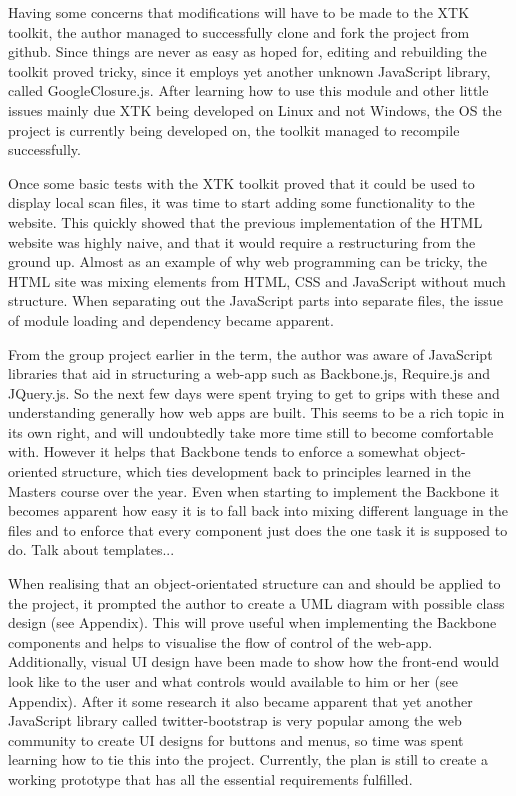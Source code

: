 \documentclass[a4paper,11pt,titlepage]{article}
\begin{document}
Having some concerns that modifications will have to be made to the XTK toolkit, the author managed to successfully clone and fork the project from github. Since things are never as easy as hoped for, editing and rebuilding the toolkit proved tricky, since it employs yet another unknown JavaScript library, called GoogleClosure.js. After learning how to use this module and other little issues mainly due XTK being developed on Linux and not Windows, the OS the project is currently being developed on, the toolkit managed to recompile successfully.

Once some basic tests with the XTK toolkit proved that it could be used to display local scan files, it was time to start adding some functionality to the website. This quickly showed that the previous implementation of the HTML website was highly naive, and that it would require a restructuring from the ground up. Almost as an example of why web programming can be tricky, the HTML site was mixing elements from HTML, CSS and JavaScript without much structure. When separating out the JavaScript parts into separate files, the issue of module loading and dependency became apparent.

From the group project earlier in the term, the author was aware of JavaScript libraries that aid in structuring a web-app such as Backbone.js, Require.js and JQuery.js. So the next few days were spent trying to get to grips with these and understanding generally how web apps are built. This seems to be a rich topic in its own right, and will undoubtedly take more time still to become comfortable with. However it helps that Backbone tends to enforce a somewhat object-oriented structure, which ties development back to principles learned in the Masters course over the year. Even when starting to implement the Backbone it becomes apparent how easy it is to fall back into mixing different language in the files and to enforce that every component just does the one task it is supposed to do. Talk about templates...

When realising that an object-orientated structure can and should be applied to the project, it prompted the author to create a UML diagram with possible class design (see Appendix). This will prove useful when implementing the Backbone components and helps to visualise the flow of control of the web-app. Additionally, visual UI design have been made to show how the front-end would look like to the user and what controls would available to him or her (see Appendix). After it some research it also became apparent that yet another JavaScript library called twitter-bootstrap is very popular among the web community to create UI designs for buttons and menus, so time was spent learning how to tie this into the project.
Currently, the plan is still to create a working prototype that has all the essential requirements fulfilled.
\end{document}
